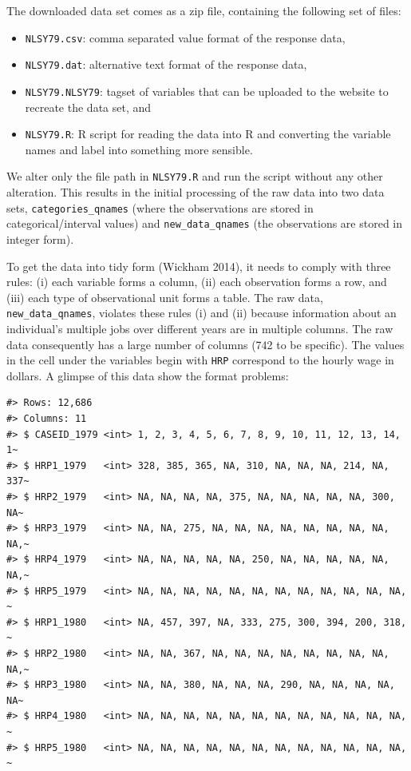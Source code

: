 \documentclass[12pt]{article}
\providecommand{\tightlist}{%
  \setlength{\itemsep}{0pt}\setlength{\parskip}{0pt}}
\begin{document}
The downloaded data set comes as a zip file, containing the following set of files:

\begin{itemize}
\tightlist
\item
  \texttt{NLSY79.csv}: comma separated value format of the response data,
\item
  \texttt{NLSY79.dat}: alternative text format of the response data,
\item
  \texttt{NLSY79.NLSY79}: tagset of variables that can be uploaded to the website to recreate the data set, and
\item
  \texttt{NLSY79.R}: R script for reading the data into R and converting the variable names and label into something more sensible.
\end{itemize}

We alter only the file path in \texttt{NLSY79.R} and run the script without any other alteration. This results in the initial processing of the raw data into two data sets, \texttt{categories\_qnames} (where the observations are stored in categorical/interval values) and \texttt{new\_data\_qnames} (the observations are stored in integer form).

To get the data into tidy form (Wickham 2014), it needs to comply with three rules: (i) each variable forms a column, (ii) each observation forms a row, and (iii) each type of observational unit forms a table. The raw data, \texttt{new\_data\_qnames}, violates these rules (i) and (ii) because information about an individual's multiple jobs over different years are in multiple columns. The raw data consequently has a large number of columns (742 to be specific). The values in the cell under the variables begin with \texttt{HRP} correspond to the hourly wage in dollars. A glimpse of this data show the format problems:

\begin{verbatim}
#> Rows: 12,686
#> Columns: 11
#> $ CASEID_1979 <int> 1, 2, 3, 4, 5, 6, 7, 8, 9, 10, 11, 12, 13, 14, 1~
#> $ HRP1_1979   <int> 328, 385, 365, NA, 310, NA, NA, NA, 214, NA, 337~
#> $ HRP2_1979   <int> NA, NA, NA, NA, 375, NA, NA, NA, NA, NA, 300, NA~
#> $ HRP3_1979   <int> NA, NA, 275, NA, NA, NA, NA, NA, NA, NA, NA, NA,~
#> $ HRP4_1979   <int> NA, NA, NA, NA, NA, 250, NA, NA, NA, NA, NA, NA,~
#> $ HRP5_1979   <int> NA, NA, NA, NA, NA, NA, NA, NA, NA, NA, NA, NA, ~
#> $ HRP1_1980   <int> NA, 457, 397, NA, 333, 275, 300, 394, 200, 318, ~
#> $ HRP2_1980   <int> NA, NA, 367, NA, NA, NA, NA, NA, NA, NA, NA, NA,~
#> $ HRP3_1980   <int> NA, NA, 380, NA, NA, NA, 290, NA, NA, NA, NA, NA~
#> $ HRP4_1980   <int> NA, NA, NA, NA, NA, NA, NA, NA, NA, NA, NA, NA, ~
#> $ HRP5_1980   <int> NA, NA, NA, NA, NA, NA, NA, NA, NA, NA, NA, NA, ~
\end{verbatim}
\end{document}

